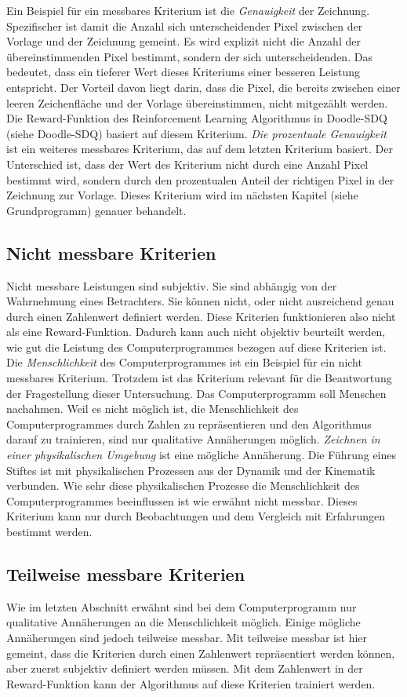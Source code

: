 Ein Beispiel für ein messbares Kriterium ist die \emph{Genauigkeit} der
Zeichnung. Spezifischer ist damit die Anzahl sich unterscheidender Pixel
zwischen der Vorlage und der Zeichnung gemeint. Es wird explizit nicht die
Anzahl der übereinstimmenden Pixel bestimmt, sondern der sich unterscheidenden.
Das bedeutet, dass ein tieferer Wert dieses Kriteriums einer besseren Leistung
entspricht. Der Vorteil davon liegt darin, dass die Pixel, die bereits zwischen
einer leeren Zeichenfläche und der Vorlage übereinstimmen, nicht mitgezählt
werden. Die Reward-Funktion des Reinforcement Learning Algorithmus in Doodle-SDQ
(siehe Doodle-SDQ) basiert auf diesem Kriterium.  %
\emph{Die prozentuale Genauigkeit} ist ein weiteres messbares Kriterium, das auf
dem letzten Kriterium basiert. Der Unterschied ist, dass der Wert des Kriterium
nicht durch eine Anzahl Pixel bestimmt wird, sondern durch den prozentualen
Anteil der richtigen Pixel in der Zeichnung zur Vorlage. Dieses Kriterium wird
im nächsten Kapitel (siehe Grundprogramm) genauer behandelt.  %


\subsection*{Nicht messbare Kriterien}
Nicht messbare Leistungen sind subjektiv. Sie sind abhängig von der Wahrnehmung
eines Betrachters. Sie können nicht, oder nicht ausreichend genau durch einen
Zahlenwert definiert werden. Diese Kriterien funktionieren also nicht als eine
Reward-Funktion. Dadurch kann auch nicht objektiv beurteilt werden, wie gut die
Leistung des Computerprogrammes bezogen auf diese Kriterien ist. Die
\emph{Menschlichkeit} des Computerprogrammes ist ein Beispiel für ein nicht
messbares Kriterium. Trotzdem ist das Kriterium relevant für die Beantwortung
der Fragestellung dieser Untersuchung. Das Computerprogramm soll Menschen nachahmen.
Weil es nicht möglich ist, die Menschlichkeit des Computerprogrammes durch
Zahlen zu repräsentieren und den Algorithmus darauf zu trainieren, sind nur
qualitative Annäherungen möglich. 
\emph{Zeichnen in einer physikalischen Umgebung} ist eine mögliche Annäherung.
Die Führung eines Stiftes ist mit physikalischen Prozessen aus der Dynamik und
der Kinematik verbunden. Wie sehr diese physikalischen Prozesse die
Menschlichkeit des Computerprogrammes beeinflussen ist wie erwähnt nicht
messbar. Dieses Kriterium kann nur durch Beobachtungen und dem Vergleich mit
Erfahrungen bestimmt werden.

\subsection*{Teilweise messbare Kriterien}
Wie im letzten Abschnitt erwähnt sind bei dem Computerprogramm nur qualitative
Annäherungen an die Menschlichkeit möglich. Einige mögliche Annäherungen sind
jedoch teilweise messbar. Mit teilweise messbar ist hier gemeint, dass die
Kriterien durch einen Zahlenwert repräsentiert werden können, aber zuerst
subjektiv definiert werden müssen. Mit dem Zahlenwert in der Reward-Funktion
kann der Algorithmus auf diese Kriterien trainiert werden.

